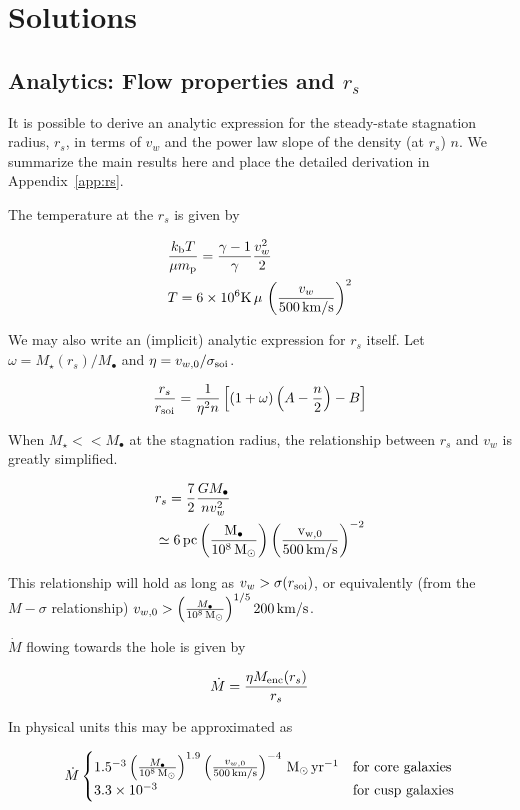 \documentclass[usenatbib,fleqn]{mn2e}
\newcommand{\Mdot}{\dot{M}}
\newcommand{\rs}{r_s}
\newcommand{\vw}{v_w}
\newcommand{\kew}{\frac{v_w^2}{2}}
\newcommand{\gammafi}{\frac{\gamma-1}{\gamma}}
\newcommand{\kb}{k_{\rm b}}
\renewcommand{\mp}{m_{\rm p}}
\newcommand{\pc}{\rm pc}
\newcommand{\Menc}{M_{\rm enc}}
\newcommand{\Mstar}{M_{\star}}
\newcommand{\Mbh}[1][]{M_{\bullet#1}}
\newcommand{\MbhNorm}{\frac{\Mbh}{10^8 \Msun}}
\newcommand{\soi}{\rm soi}
\newcommand{\rsoi}{r_{\soi}}
\newcommand{\vwO}{v_{w,0}}
\newcommand{\x}{\frac{r_s}{\rsoi}}
\newcommand{\vwNormB}{\frac{\vwO}{500 \, {\rm km/s}}}
\newcommand{\pyear}{{\rm yr}^{-1}}
\begin{document}
\section{Solutions}
\subsection{Analytics: Flow properties and $\rs$}
It is possible to derive an analytic expression for the steady-state stagnation radius, $\rs$, in terms of $v_w$ and the power law slope of the density (at $\rs$) $n$.   We summarize the main results here and place the detailed derivation in Appendix~\ref{app:rs}.

The temperature at the $\rs$ is given by

\begin{align}
 &\frac{\kb T}{\mu \mp}=\gammafi \kew \label{eq:tstag}\\
 &T=6 \times 10^6 {\rm K} \, \mu \, \left({\frac{\vw}{500 \,{\rm km/s}}}\right)^2 
\end{align}

We may also write an (implicit) analytic expression for $\rs$ itself. Let $\omega=\Mstar(\rs)/\Mbh$ and  $\eta=v_{w,0}/\sigma_{\rm soi}$. 

\begin{align}
\x=\frac{1}{\eta^2 n}\left[ (1+\omega)\left(A-\frac{n}{2}\right)-B\right]
\label{eq:stag_analytic}
\end{align}

When $\Mstar << \Mbh$ at the stagnation radius, the relationship between $\rs$ and $\vw$ is greatly simplified. 

\begin{align}
&\rs=\frac{7}{2}\frac{G \Mbh}{n \vw^2}\\
&\simeq 6 \, \pc \left(\MbhNorm\right) \left(\vwNormB\right)^{-2}
\label{eq:stag_simple}
\end{align}

This relationship will hold as long as $\vw > \sigma(\rsoi)$, or equivalently (from the $M-\sigma$ relationship) $\vwO > \left(\frac{\Mbh}{10^8 \Msun}\right)^{1/5} 200 {\rm \,  km/s}$.

$\Mdot$ flowing towards the hole is given by

\begin{align}
\dot{M}=\frac{\eta \Menc(\rs)}{\rs}
\end{align}

In physical units this may be approximated as 

\[
\dot{M}
\begin{cases}
   1.5 \time 10^{-3}  \left(\MbhNorm\right)^{1.9} \left(\vwNormB\right)^{-4} \Msun \, \pyear& \text{for core galaxies} \\
   3.3 \times 10^{-3}   & \text{for cusp galaxies}      
\end{cases}
\label{eq:cooling}
\]
\end{document}
